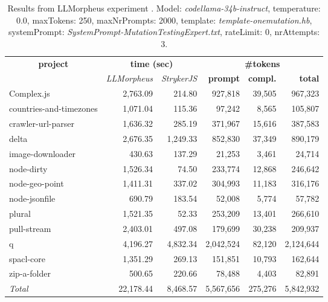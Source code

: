 
\begin{table*}[hbt!]
\centering
{\scriptsize
\begin{tabular}{l||r|r|r|r|r}
\multicolumn{1}{c|}{\bf project} & \multicolumn{2}{|c|}{\bf time (sec)} & \multicolumn{3}{|c|}{\bf \#tokens} \\
               & {\it LLMorpheus} & {\it StrykerJS} & {\bf prompt} & {\bf compl.} & {\bf total} \\
\hline
  Complex.js & 2,763.09 & 214.80 & 927,818 & 39,505 & 967,323 \\ 
countries-and-timezones & 1,071.04 & 115.36 & 97,242 & 8,565 & 105,807 \\ 
crawler-url-parser & 1,636.32 & 285.19 & 371,967 & 15,616 & 387,583 \\ 
delta & 2,676.35 & 1,249.33 & 852,830 & 37,349 & 890,179 \\ 
image-downloader & 430.63 & 137.29 & 21,253 & 3,461 & 24,714 \\ 
node-dirty & 1,526.34 & 74.50 & 233,774 & 12,868 & 246,642 \\ 
node-geo-point & 1,411.31 & 337.02 & 304,993 & 11,183 & 316,176 \\ 
node-jsonfile & 690.79 & 183.54 & 52,008 & 5,774 & 57,782 \\ 
plural & 1,521.35 & 52.33 & 253,209 & 13,401 & 266,610 \\ 
pull-stream & 2,403.01 & 497.08 & 179,699 & 30,238 & 209,937 \\ 
q & 4,196.27 & 4,832.34 & 2,042,524 & 82,120 & 2,124,644 \\ 
spacl-core & 1,351.29 & 269.13 & 151,851 & 10,793 & 162,644 \\ 
zip-a-folder & 500.65 & 220.66 & 78,488 & 4,403 & 82,891 \\ 
\hline
  \textit{Total} & 22,178.44 & 8,468.57 & 5,567,656 & 275,276 & 5,842,932 \\
  \end{tabular}
  }
  \\[2mm]
  \caption{Results from LLMorpheus experiment .
    Model: \textit{codellama-34b-instruct}, 
    temperature: 0.0, 
    maxTokens: 250, 
    maxNrPrompts: 2000, 
    template: \textit{template-onemutation.hb}, 
    systemPrompt: \textit{SystemPrompt-MutationTestingExpert.txt}, 
    rateLimit: 0, 
    nrAttempts: 3.  
  }
  \label{table:Cost:run371:codellama-34b-instruct:template-onemutation.hb:0.0}
\end{table*}